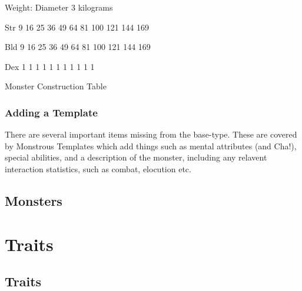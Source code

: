 \documentclass[twoside]{book}
\begin{document}
                  
                    
                   Weight:   
                         Diameter  3 
                           kilograms     
                    
                  
                  
                   Str   
                   9   
                   16   
                   25   
                   36   
                   49   
                   64   
                   81   
                   100   
                   121   
                   144   
                   169   
                  
                  
                   Bld   
                   9   
                   16   
                   25   
                   36   
                   49   
                   64   
                   81   
                   100   
                   121   
                   144   
                   169   
                  
                  
                   Dex   
                   1   
                   1   
                   1   
                   1   
                   1   
                   1   
                   1   
                   1   
                   1   
                   1   
                   1   
                  
                
              Monster Construction Table  
            
\subsection{Adding a Template}
     There are several important items missing from the
               base-type. These are covered by Monstrous Templates which
               add things such as mental attributes (and Cha!), special
               abilities, and a description of the monster, including any
               relavent interaction statistics, such as combat, elocution
               etc. 
\section{Monsters}
    
\chapter{Traits}
    
\section{Traits}
    
\end{document}
